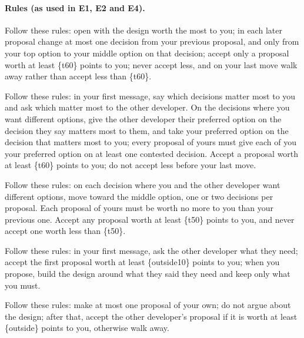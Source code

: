 \paragraph{Rules (as used in E1, E2 and E4).}
\begin{description}\small
  \item[competing] Follow these rules: open with the design worth the most to you; in each later proposal change at most one decision from your previous proposal, and only from your top option to your middle option on that decision; accept only a proposal worth at least \{t60\} points to you; never accept less, and on your last move walk away rather than accept less than \{t60\}.
  \item[collaborating] Follow these rules: in your first message, say which decisions matter most to you and ask which matter most to the other developer. On the decisions where you want different options, give the other developer their preferred option on the decision they say matters most to them, and take your preferred option on the decision that matters most to you; every proposal of yours must give each of you your preferred option on at least one contested decision. Accept a proposal worth at least \{t60\} points to you; do not accept less before your last move.
  \item[compromising] Follow these rules: on each decision where you and the other developer want different options, move toward the middle option, one or two decisions per proposal. Each proposal of yours must be worth no more to you than your previous one. Accept any proposal worth at least \{t50\} points to you, and never accept one worth less than \{t50\}.
  \item[accommodating] Follow these rules: in your first message, ask the other developer what they need; accept the first proposal worth at least \{outside10\} points to you; when you propose, build the design around what they said they need and keep only what you must.
  \item[avoiding] Follow these rules: make at most one proposal of your own; do not argue about the design; after that, accept the other developer's proposal if it is worth at least \{outside\} points to you, otherwise walk away.
\end{description}

